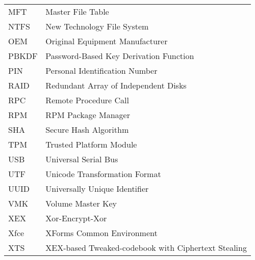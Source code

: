 \begin{longtable}{ll}
  MFT & Master File Table \\
  NTFS & New Technology File System \\
  OEM & Original Equipment Manufacturer \\
  PBKDF & Password-Based Key Derivation Function \\
  PIN & Personal Identification Number \\
  RAID & Redundant Array of Independent Disks \\
  RPC & Remote Procedure Call \\
  RPM & RPM Package Manager \\
  SHA & Secure Hash Algorithm \\
  TPM & Trusted Platform Module \\
  USB & Universal Serial Bus \\
  UTF & Unicode Transformation Format \\
  UUID & Universally Unique Identifier \\
  VMK & Volume Master Key \\
  XEX & Xor-Encrypt-Xor \\
  Xfce & XForms Common Environment \\
  XTS & XEX-based Tweaked-codebook with Ciphertext Stealing \\
\end{longtable}

